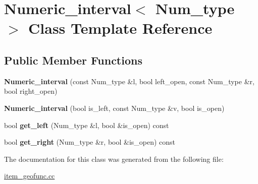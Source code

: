 \hypertarget{classNumeric__interval}{}\section{Numeric\+\_\+interval$<$ Num\+\_\+type $>$ Class Template Reference}
\label{classNumeric__interval}
\subsection*{Public Member Functions}
\begin{DoxyCompactItemize}
\item 
\mbox{\label{classNumeric__interval_a3e14ff3ce2a9739975aac8683a9b360f}} 
{\bfseries Numeric\+\_\+interval} (const Num\+\_\+type \&l, bool left\+\_\+open, const Num\+\_\+type \&r, bool right\+\_\+open)
\item 
\mbox{\label{classNumeric__interval_aefdcfd66bf57d2f8602f890119ca6c29}} 
{\bfseries Numeric\+\_\+interval} (bool is\+\_\+left, const Num\+\_\+type \&v, bool is\+\_\+open)
\item 
\mbox{\label{classNumeric__interval_ada8344037ca8eca3c2b8e21e959df9e4}} 
bool {\bfseries get\+\_\+left} (Num\+\_\+type \&l, bool \&is\+\_\+open) const
\item 
\mbox{\label{classNumeric__interval_a44cb0687ca24970dcfde6a39ad23758a}} 
bool {\bfseries get\+\_\+right} (Num\+\_\+type \&r, bool \&is\+\_\+open) const
\end{DoxyCompactItemize}


The documentation for this class was generated from the following file\+:\begin{DoxyCompactItemize}
\item 
\mbox{\hyperlink{item__geofunc_8cc}{item\+\_\+geofunc.\+cc}}\end{DoxyCompactItemize}

